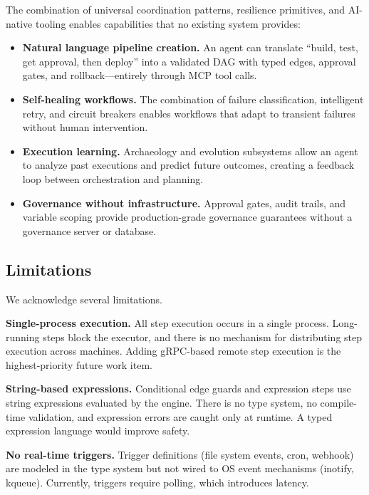 \documentclass[10pt, twocolumn]{article}
\begin{document}
The combination of universal coordination patterns, resilience primitives, and AI-native tooling enables capabilities that no existing system provides:

\begin{itemize}[nosep, leftmargin=*]
  \item \textbf{Natural language pipeline creation.} An agent can translate ``build, test, get approval, then deploy'' into a validated DAG with typed edges, approval gates, and rollback---entirely through MCP tool calls.
  \item \textbf{Self-healing workflows.} The combination of failure classification, intelligent retry, and circuit breakers enables workflows that adapt to transient failures without human intervention.
  \item \textbf{Execution learning.} Archaeology and evolution subsystems allow an agent to analyze past executions and predict future outcomes, creating a feedback loop between orchestration and planning.
  \item \textbf{Governance without infrastructure.} Approval gates, audit trails, and variable scoping provide production-grade governance guarantees without a governance server or database.
\end{itemize}

\subsection{Limitations}\label{sec:limitations}

We acknowledge several limitations.

\textbf{Single-process execution.} All step execution occurs in a single process. Long-running steps block the executor, and there is no mechanism for distributing step execution across machines. Adding gRPC-based remote step execution is the highest-priority future work item.

\textbf{String-based expressions.} Conditional edge guards and expression steps use string expressions evaluated by the engine. There is no type system, no compile-time validation, and expression errors are caught only at runtime. A typed expression language would improve safety.

\textbf{No real-time triggers.} Trigger definitions (file system events, cron, webhook) are modeled in the type system but not wired to OS event mechanisms (inotify, kqueue). Currently, triggers require polling, which introduces latency.
\end{document}
